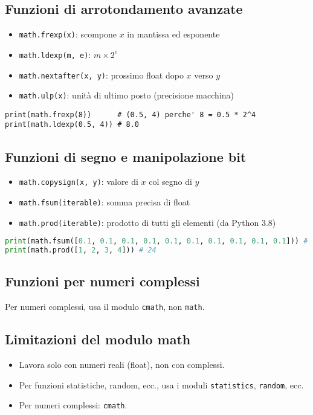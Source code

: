 \documentclass[a4paper,12pt]{article}
\begin{document}
\subsection*{Funzioni di arrotondamento avanzate}
\begin{itemize}
    \item \texttt{math.frexp(x)}: scompone $x$ in mantissa ed esponente
    \item \texttt{math.ldexp(m, e)}: $m \times 2^e$
    \item \texttt{math.nextafter(x, y)}: prossimo float dopo $x$ verso $y$
    \item \texttt{math.ulp(x)}: unità di ultimo posto (precisione macchina)
\end{itemize}
\begin{lstlisting}
print(math.frexp(8))      # (0.5, 4) perche' 8 = 0.5 * 2^4
print(math.ldexp(0.5, 4)) # 8.0
\end{lstlisting}

\subsection*{Funzioni di segno e manipolazione bit}
\begin{itemize}
    \item \texttt{math.copysign(x, y)}: valore di $x$ col segno di $y$
    \item \texttt{math.fsum(iterable)}: somma precisa di float
    \item \texttt{math.prod(iterable)}: prodotto di tutti gli elementi (da Python 3.8)
\end{itemize}
\begin{lstlisting}[language=Python, basicstyle=\ttfamily\footnotesize, breaklines=true, frame=single]
print(math.fsum([0.1, 0.1, 0.1, 0.1, 0.1, 0.1, 0.1, 0.1, 0.1, 0.1])) # 1.0
print(math.prod([1, 2, 3, 4])) # 24
\end{lstlisting}

\subsection*{Funzioni per numeri complessi}
Per numeri complessi, usa il modulo \texttt{cmath}, non \texttt{math}.

\subsection*{Limitazioni del modulo math}
\begin{itemize}
    \item Lavora solo con numeri reali (float), non con complessi.
    \item Per funzioni statistiche, random, ecc., usa i moduli \texttt{statistics}, \texttt{random}, ecc.
    \item Per numeri complessi: \texttt{cmath}.
\end{itemize}
\end{document}
